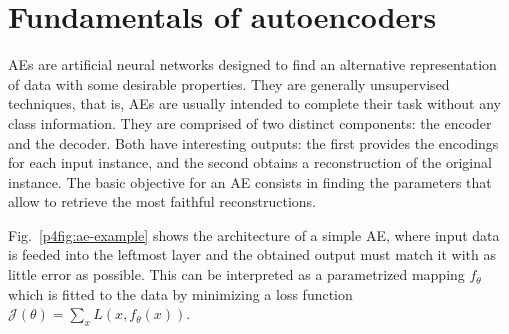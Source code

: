 \section{Fundamentals of autoencoders}
\label{p4sec.fundamentals}

AEs are artificial neural networks designed to find an alternative representation of data with some desirable properties. They are generally unsupervised techniques, that is, AEs are usually intended to complete their task without any class information. They are comprised of two distinct components: the encoder and the decoder. Both have interesting outputs: the first provides the encodings for each input instance, and the second obtains a reconstruction of the original instance. The basic objective for an AE consists in finding the parameters that allow to retrieve the most faithful reconstructions.

Fig.~\ref{p4fig:ae-example} shows the architecture of a simple AE, where input data is feeded into the leftmost layer and the obtained output must match it with as little error as possible. This can be interpreted as a parametrized mapping $f_{\theta}$ which is fitted to the data by minimizing a loss function $\mathcal J(\theta) = \sum_x L(x,f_{\theta}(x))$.

